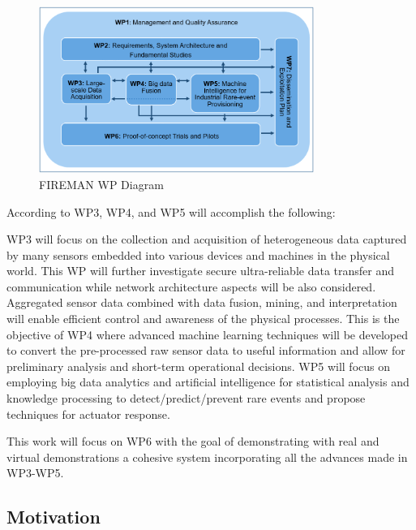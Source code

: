 \begin{figure}[H]
    \centering
    \includegraphics[width=0.8\textwidth]{Images/FIREMAN_pert_diagram.png}
    \caption{FIREMAN WP Diagram}
    \label{fig:wp-diagram}
\end{figure}

According to \cite{fireman-about} WP3, WP4, and WP5 will accomplish the following:
\begin{displayquote}
WP3 will focus on the collection and acquisition of heterogeneous data captured by many sensors embedded into various devices and machines in the physical world. This WP will further investigate secure ultra-reliable data transfer and communication while network architecture aspects will be also considered. Aggregated sensor data combined with data fusion, mining, and interpretation will enable efficient control and awareness of the physical processes. This is the objective of WP4 where advanced machine learning techniques will be developed to convert the pre-processed raw sensor data to useful information and allow for preliminary analysis and short-term operational decisions. WP5 will focus on employing big data analytics and artificial intelligence for statistical analysis and knowledge processing to detect/predict/prevent rare events and propose techniques for actuator response.
\end{displayquote}

This work will focus on WP6 with the goal of demonstrating with real and virtual demonstrations a cohesive system incorporating all the advances made in WP3-WP5.  

\subsection{Motivation}

